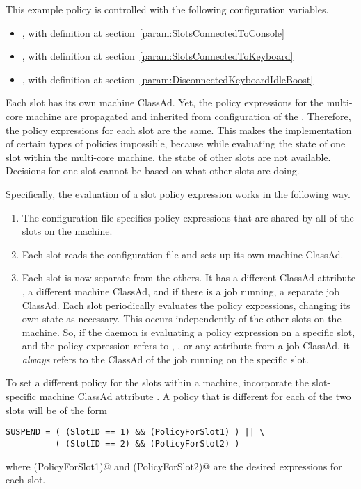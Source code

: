 This example policy is
controlled with the following configuration variables.
\begin{itemize}
\item {}, with definition at
section~\ref{param:SlotsConnectedToConsole}
\item {}, with definition at
section~\ref{param:SlotsConnectedToKeyboard}
\item {}, with definition at
section~\ref{param:DisconnectedKeyboardIdleBoost}
\end{itemize}

Each slot has its own machine ClassAd.
Yet, the policy expressions for the multi-core machine are
propagated and inherited from configuration of the .
Therefore, the policy expressions for each slot are the same.
This makes the implementation of certain types of policies impossible,
because while evaluating the state of one slot within the multi-core machine,
the state of other slots are not available.
Decisions for one slot cannot be based on what other slots are doing.

Specifically, the evaluation of a slot policy expression works in
the following way.
\begin{enumerate}
\item 
The configuration file specifies policy expressions that are shared by
all of the slots on the machine.
\item 
Each slot reads the configuration file and sets up its own machine ClassAd.
\item 
Each slot is now separate from the others.  It has a
different ClassAd attribute ,
a different machine ClassAd, 
and if there is a job running, a separate job ClassAd.
Each slot periodically
evaluates the policy expressions, changing its own state as necessary.
This occurs independently of the other slots on the machine.
So, if the  daemon is evaluating a policy expression
on a specific slot,
and the policy expression refers to , ,
or any attribute from a job ClassAd,
it \emph{always} refers to the ClassAd of the
job running on the specific slot.
\end{enumerate}

To set a different policy for the slots within a machine,
incorporate the slot-specific machine ClassAd attribute .
A  policy that is different for each of the two slots
will be of the form
\begin{verbatim}
SUSPEND = ( (SlotID == 1) && (PolicyForSlot1) ) || \
          ( (SlotID == 2) && (PolicyForSlot2) )
\end{verbatim}
where \verb@(PolicyForSlot1)@ and \verb@(PolicyForSlot2)@ are the
desired expressions for each slot.

